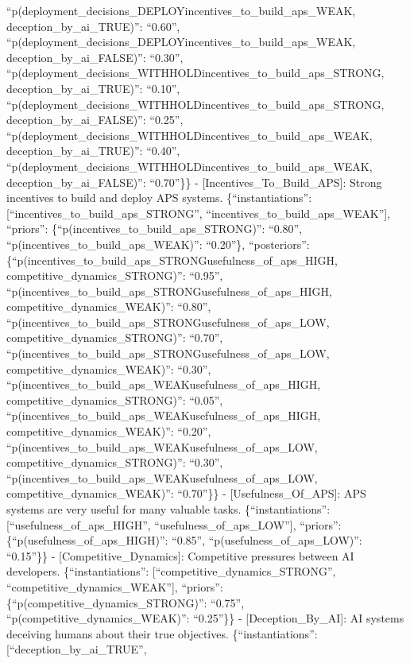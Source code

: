 \documentclass[
  11pt,
  letterpaper,
]{book}
\begin{document}
``p(deployment\_decisions\_DEPLOY\textbar incentives\_to\_build\_aps\_WEAK,
deception\_by\_ai\_TRUE)'': ``0.60'',
``p(deployment\_decisions\_DEPLOY\textbar incentives\_to\_build\_aps\_WEAK,
deception\_by\_ai\_FALSE)'': ``0.30'',
``p(deployment\_decisions\_WITHHOLD\textbar incentives\_to\_build\_aps\_STRONG,
deception\_by\_ai\_TRUE)'': ``0.10'',
``p(deployment\_decisions\_WITHHOLD\textbar incentives\_to\_build\_aps\_STRONG,
deception\_by\_ai\_FALSE)'': ``0.25'',
``p(deployment\_decisions\_WITHHOLD\textbar incentives\_to\_build\_aps\_WEAK,
deception\_by\_ai\_TRUE)'': ``0.40'',
``p(deployment\_decisions\_WITHHOLD\textbar incentives\_to\_build\_aps\_WEAK,
deception\_by\_ai\_FALSE)'': ``0.70''\}\} -
{[}Incentives\_To\_Build\_APS{]}: Strong incentives to build and deploy
APS systems. \{``instantiations'':
{[}``incentives\_to\_build\_aps\_STRONG'',
``incentives\_to\_build\_aps\_WEAK''{]}, ``priors'':
\{``p(incentives\_to\_build\_aps\_STRONG)'': ``0.80'',
``p(incentives\_to\_build\_aps\_WEAK)'': ``0.20''\}, ``posteriors'':
\{``p(incentives\_to\_build\_aps\_STRONG\textbar usefulness\_of\_aps\_HIGH,
competitive\_dynamics\_STRONG)'': ``0.95'',
``p(incentives\_to\_build\_aps\_STRONG\textbar usefulness\_of\_aps\_HIGH,
competitive\_dynamics\_WEAK)'': ``0.80'',
``p(incentives\_to\_build\_aps\_STRONG\textbar usefulness\_of\_aps\_LOW,
competitive\_dynamics\_STRONG)'': ``0.70'',
``p(incentives\_to\_build\_aps\_STRONG\textbar usefulness\_of\_aps\_LOW,
competitive\_dynamics\_WEAK)'': ``0.30'',
``p(incentives\_to\_build\_aps\_WEAK\textbar usefulness\_of\_aps\_HIGH,
competitive\_dynamics\_STRONG)'': ``0.05'',
``p(incentives\_to\_build\_aps\_WEAK\textbar usefulness\_of\_aps\_HIGH,
competitive\_dynamics\_WEAK)'': ``0.20'',
``p(incentives\_to\_build\_aps\_WEAK\textbar usefulness\_of\_aps\_LOW,
competitive\_dynamics\_STRONG)'': ``0.30'',
``p(incentives\_to\_build\_aps\_WEAK\textbar usefulness\_of\_aps\_LOW,
competitive\_dynamics\_WEAK)'': ``0.70''\}\} -
{[}Usefulness\_Of\_APS{]}: APS systems are very useful for many valuable
tasks. \{``instantiations'': {[}``usefulness\_of\_aps\_HIGH'',
``usefulness\_of\_aps\_LOW''{]}, ``priors'':
\{``p(usefulness\_of\_aps\_HIGH)'': ``0.85'',
``p(usefulness\_of\_aps\_LOW)'': ``0.15''\}\} -
{[}Competitive\_Dynamics{]}: Competitive pressures between AI
developers. \{``instantiations'': {[}``competitive\_dynamics\_STRONG'',
``competitive\_dynamics\_WEAK''{]}, ``priors'':
\{``p(competitive\_dynamics\_STRONG)'': ``0.75'',
``p(competitive\_dynamics\_WEAK)'': ``0.25''\}\} -
{[}Deception\_By\_AI{]}: AI systems deceiving humans about their true
objectives. \{``instantiations'': {[}``deception\_by\_ai\_TRUE'',
\end{document}
